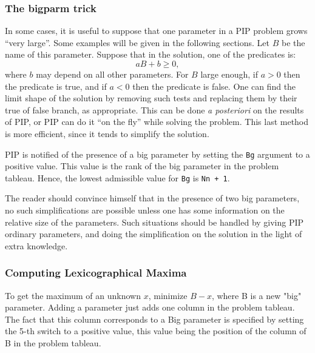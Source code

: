 \documentclass[12pt,a4paper,dvips]{article}
\begin{document}
\subsubsection{The bigparm trick}

In some cases, it is useful to suppose that one parameter in a PIP problem
grows ``very large''. Some examples will be given in the following sections.
Let $B$ be the name of this parameter. Suppose that in the solution, one
of the predicates is:
\[ a B + b \ge 0 ,\]
where $b$ may depend on all other parameters. For $B$ large enough, if $a > 0$
then the predicate is true, and if $a < 0$ then the predicate is false.
One can find the limit shape of the solution by removing such tests and 
replacing them by their true of false branch, as appropriate. This can be done
{\sl a posteriori\/} on the results of PIP, or PIP can do it ``on the fly''
while solving the problem. This last method is more efficient, since it
tends to simplify the solution.

PIP is notified of the presence of a big parameter by setting the {\tt Bg}
argument to a positive value. This value is the rank of the big parameter
in the problem tableau. Hence, the lowest admissible value for {\tt Bg}
is {\tt Nn + 1}.

The reader should convince himself that in the presence of two big
parameters, no such simplifications are possible unless one has some
information on the relative size of the parameters. Such situations
should be handled by giving PIP ordinary parameters, and doing the
simplification on the solution in the light of extra knowledge.

\subsubsection{Computing Lexicographical Maxima}
\label{maximum}
To get the maximum of an unknown $x$,  minimize $B - x$, where
B is a new "big" parameter. Adding a parameter just adds one column
in the problem tableau. The fact that this column corresponds to a Big
parameter is specified by setting the 5-th switch to a positive value,
this value being the position of the column of B in the problem
tableau.
\end{document}
